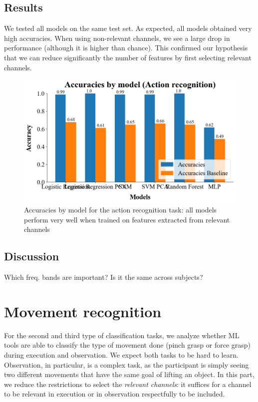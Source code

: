 \documentclass[10pt,conference,compsocconf]{IEEEtran}
\begin{document}
\subsection{Results}
We tested all models on the same test set. As expected, all models obtained very high accuracies. When using non-relevant channels, we see a large drop in performance (although it is higher than chance). This confirmed our hypothesis that we can reduce significantly the number of features by first selecting relevant channels.

\begin{figure}[h!]
  \center
  \includegraphics[width=\linewidth]{images/2024-12-15-14-35-58.png}
  \caption{Accuracies by model for the action recognition task: all models perform very well when trained on features extracted from relevant channels}
\end{figure}
\FloatBarrier

\subsection{Discussion}
Which freq. bands are important? Is it the same across subjects?

\section{Movement recognition}
\label{sec:objectrecognition}
For the second and third type of classification tasks, we analyze whether ML tools are able to classify the type of movement done (pinch grasp or force grasp) during execution and observation. We expect both tasks to be hard to learn. Observation, in particular, is a complex task, as the participant is simply seeing two different movements that have the same goal of lifting an object. In this part, we reduce the restrictions to select the \textit{relevant channels}: it suffices for a channel to be relevant in execution or in observation respectfully to be included.
\end{document}
